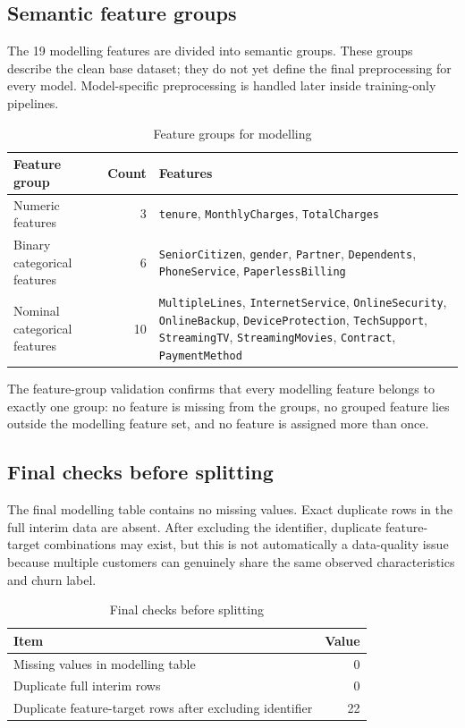 \subsection{Semantic feature groups}

The 19 modelling features are divided into semantic groups. These groups describe the clean base dataset; they do not yet define the final preprocessing for every model. Model-specific preprocessing is handled later inside training-only pipelines.

\begin{table}[H]
\centering
\caption{Feature groups for modelling}
\begin{tabular}{lrp{9.5cm}}
\toprule
Feature group & Count & Features \\
\midrule
Numeric features & 3 & \texttt{tenure}, \texttt{MonthlyCharges}, \texttt{TotalCharges} \\
Binary categorical features & 6 & \texttt{SeniorCitizen}, \texttt{gender}, \texttt{Partner}, \texttt{Dependents}, \texttt{PhoneService}, \texttt{PaperlessBilling} \\
Nominal categorical features & 10 & \texttt{MultipleLines}, \texttt{InternetService}, \texttt{OnlineSecurity}, \texttt{OnlineBackup}, \texttt{DeviceProtection}, \texttt{TechSupport}, \texttt{StreamingTV}, \texttt{StreamingMovies}, \texttt{Contract}, \texttt{PaymentMethod} \\
\bottomrule
\end{tabular}
\end{table}

The feature-group validation confirms that every modelling feature belongs to exactly one group: no feature is missing from the groups, no grouped feature lies outside the modelling feature set, and no feature is assigned more than once.

\subsection{Final checks before splitting}

The final modelling table contains no missing values. Exact duplicate rows in the full interim data are absent. After excluding the identifier, duplicate feature-target combinations may exist, but this is not automatically a data-quality issue because multiple customers can genuinely share the same observed characteristics and churn label.

\begin{table}[H]
\centering
\caption{Final checks before splitting}
\begin{tabular}{lr}
\toprule
Item & Value \\
\midrule
Missing values in modelling table & 0 \\
Duplicate full interim rows & 0 \\
Duplicate feature-target rows after excluding identifier & 22 \\
\bottomrule
\end{tabular}
\end{table}

